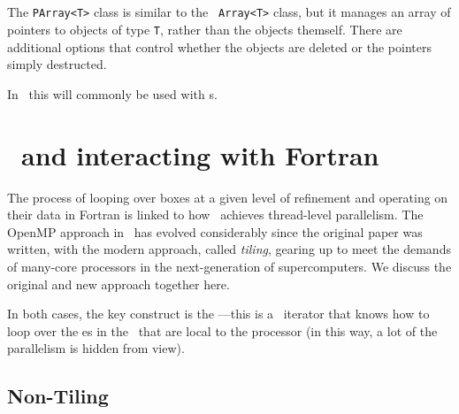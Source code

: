 \subsection{\parray}

The {\tt PArray<T>} class is similar to the \cpp\ {\tt Array<T>} class,
but it manages an array of pointers to objects of type {\tt T}, rather
than the objects themself.  There are additional options that control
whether the objects are deleted or the pointers simply destructed.

In \castro\, this will commonly be used with \multifab s.


\section{\mfiter\ and interacting with Fortran}

The process of looping over boxes at a given level of refinement and
operating on their data in Fortran is linked to how \castro\ achieves
thread-level parallelism.  The OpenMP approach in \castro\ has evolved
considerably since the original paper was written, with the modern
approach, called {\em tiling}, gearing up to meet the demands of
many-core processors in the next-generation of supercomputers.  We
discuss the original and new approach together here.

In both cases, the key construct is the \mfiter---this is a
\cpp\ iterator that knows how to loop over the \farraybox es in the
\multifab\ that are local to the processor (in this way, a lot of the
parallelism is hidden from view).

\subsection{Non-Tiling \mfiter}

